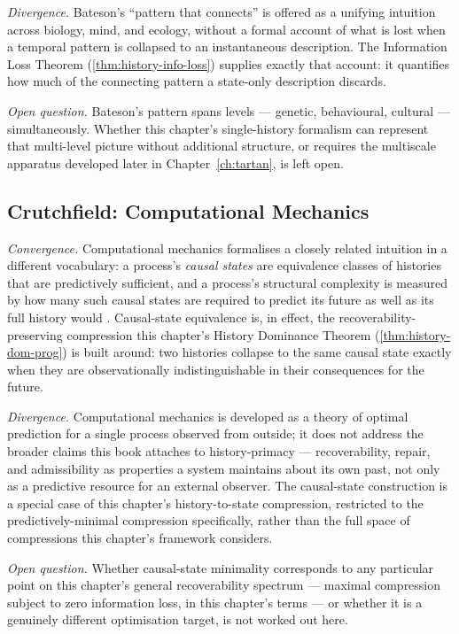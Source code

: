 \documentclass[12pt,twoside,openright]{book}
\begin{document}
\emph{Divergence.} Bateson's ``pattern that connects'' is
offered as a unifying intuition across biology, mind, and
ecology, without a formal account of what is lost when a
temporal pattern is collapsed to an instantaneous description.
The Information Loss Theorem (\cref{thm:history-info-loss})
supplies exactly that account: it quantifies how much of the
connecting pattern a state-only description discards.

\emph{Open question.} Bateson's pattern spans levels ---
genetic, behavioural, cultural --- simultaneously. Whether this
chapter's single-history formalism can represent that
multi-level picture without additional structure, or requires
the multiscale apparatus developed later in
Chapter~\ref{ch:tartan}, is left open.

\subsection*{Crutchfield: Computational Mechanics}

\emph{Convergence.} Computational mechanics formalises a closely
related intuition in a different vocabulary: a process's
\emph{causal states} are equivalence classes of histories that
are predictively sufficient, and a process's structural
complexity is measured by how many such causal states are
required to predict its future as well as its full history
would \parencite{crutchfield2012}. Causal-state equivalence is,
in effect, the recoverability-preserving compression this
chapter's History Dominance Theorem
(\cref{thm:history-dom-prog}) is built around: two histories
collapse to the same causal state exactly when they are
observationally indistinguishable in their consequences for the
future.

\emph{Divergence.} Computational mechanics is developed as a
theory of optimal prediction for a single process observed from
outside; it does not address the broader claims this book
attaches to history-primacy --- recoverability, repair, and
admissibility as properties a system maintains about its own
past, not only as a predictive resource for an external
observer. The causal-state construction is a special case of
this chapter's history-to-state compression, restricted to the
predictively-minimal compression specifically, rather than the
full space of compressions this chapter's framework considers.

\emph{Open question.} Whether causal-state minimality
corresponds to any particular point on this chapter's general
recoverability spectrum --- maximal compression subject to zero
information loss, in this chapter's terms --- or whether it is a
genuinely different optimisation target, is not worked out here.
\end{document}
